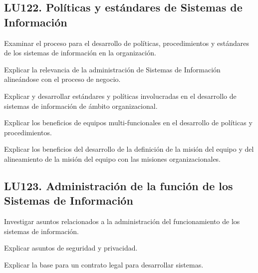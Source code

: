 \subsection{LU122. Políticas y estándares de Sistemas de Información}\label{sec:BOK-LU122}\label{sec:LU122}
\begin{LearningUnit}
\begin{LUGoal}
\item Examinar el proceso para el desarrollo de políticas, procedimientos y estándares de los sistemas de información en la organización.
\end{LUGoal}

\begin{LUObjective}
\item Explicar la relevancia de la administración de Sistemas de Información alineándose con el proceso de negocio.
\item Explicar y desarrollar estándares y políticas involucradas en el desarrollo de sistemas de información de ámbito organizacional.
\item Explicar los beneficios de equipos multi-funcionales en el desarrollo de políticas y procedimientos.
\item Explicar los beneficios del desarrollo de la definición de la misión del equipo y del alineamiento de la misión del equipo con las misiones organizacionales.
\end{LUObjective}
\end{LearningUnit}

\subsection{LU123. Administración de la función de los Sistemas de Información}\label{sec:BOK-LU123}\label{sec:LU123}
\begin{LearningUnit}
\begin{LUGoal}
\item Investigar asuntos relacionados a la administración del funcionamiento de los sistemas de información.
\end{LUGoal}

\begin{LUObjective}
\item Explicar asuntos de seguridad y privacidad.
\item Explicar la base para un contrato legal para desarrollar sistemas.
\end{LUObjective}
\end{LearningUnit}

